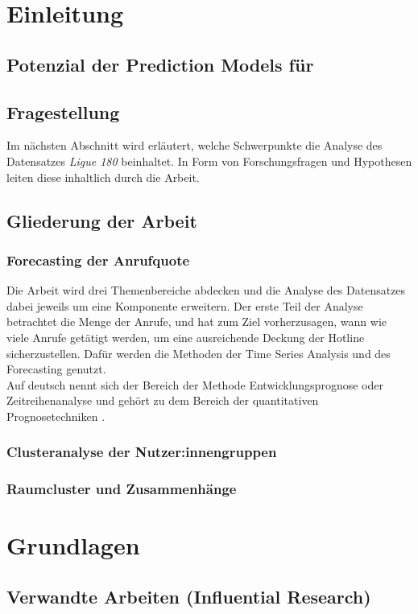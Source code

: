 \documentclass[12pt]{report}
\begin{document}
	\renewcommand{\headrulewidth}{0.1 pt}
	\renewcommand{\footrulewidth}{0 pt}
	
	\chapter{Einleitung}
	
	\section{Potenzial der Prediction Models für} %
	\section{Fragestellung}
	Im nächsten Abschnitt wird erläutert, welche Schwerpunkte die Analyse des Datensatzes \textit{Ligue 180} beinhaltet. In Form von Forschungsfragen und Hypothesen leiten diese inhaltlich durch die Arbeit. 
	\section{Gliederung der Arbeit}
	\subsection{Forecasting der Anrufquote}
	Die Arbeit wird drei Themenbereiche abdecken und die Analyse des Datensatzes dabei jeweils um eine Komponente erweitern. Der erste Teil der Analyse betrachtet die Menge der Anrufe, und hat zum Ziel vorherzusagen, wann wie viele Anrufe getätigt werden, um eine ausreichende Deckung der Hotline sicherzustellen. Dafür werden die Methoden der Time Series Analysis und des Forecasting genutzt. \\
	Auf deutsch nennt sich der Bereich der Methode Entwicklungsprognose oder Zeitreihenanalyse und gehört zu dem Bereich der quantitativen Prognosetechniken \cite[S. 11]{Vogel.2015}.
	\subsection{Clusteranalyse der Nutzer:innengruppen}
	\subsection{Raumcluster und Zusammenhänge}
	\chapter{Grundlagen} 
	\section{Verwandte Arbeiten (Influential Research)} 
\end{document}
